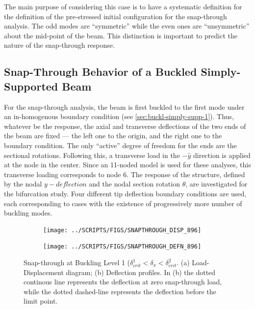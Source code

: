 \documentclass[10pt]{article}
\begin{document}
The main purpose of considering this case is to have a systematic
definition for the definition of the pre-stressed initial
configuration for the snap-through analysis. The odd modes are
``symmetric'' while the even ones are ``unsymmetric'' about the
mid-point of the beam. This distinction is important to predict the
nature of the snap-through response.

\subsection{Snap-Through Behavior of a Buckled Simply-Supported Beam}
\label{sec:snap-thro-behav}

For the snap-through analysis, the beam is first buckled to the first
mode under an in-homogenous boundary condition (see
\cref{sec:buckl-simply-supp-1}). Thus, whatever be the response, the
axial and transverse deflections of the two ends of the beam are fixed
--- the left one to the origin, and the right one to the boundary
condition. The only ``active'' degree of freedom for the ends are the
sectional rotations. Following this, a transverse load in the
$-\hat{y}$ direction is applied at the node in the center. Since an
11-noded model is used for these analyses, this transverse loading
corresponds to node 6. The response of the structure, defined by the
nodal $y-deflection$ and the nodal section rotation $\theta$, are
investigated for the bifurcation study. Four different tip deflection
boundary conditions are used, each corresponding to cases with the
existence of progressively more number of buckling modes.

\begin{figure}[!h]
  \centering
  \begin{subfigure}[!t]{0.45\linewidth}
    \texttt{[image: ../SCRIPTS/FIGS/SNAPTHROUGH\_DISP\_896]}
    \caption{}
  \end{subfigure}%
  \begin{subfigure}[!t]{0.45\linewidth}
    \texttt{[image: ../SCRIPTS/FIGS/SNAPTHROUGH\_DEFN\_896]}
    \caption{}
  \end{subfigure}%
  \caption{Snap-through at Buckling Level 1 ($\delta_{crit}^1 <
    \delta_x < \delta_{crit}^2$. (a) Load-Displacement diagram; (b)
    Deflection profiles. In (b) the dotted continous line represents
    the deflection at zero snap-through load, while the dotted
    dashed-line represents the deflection before the limit point.}
  \label{fig:buck1}
\end{figure}
\end{document}
